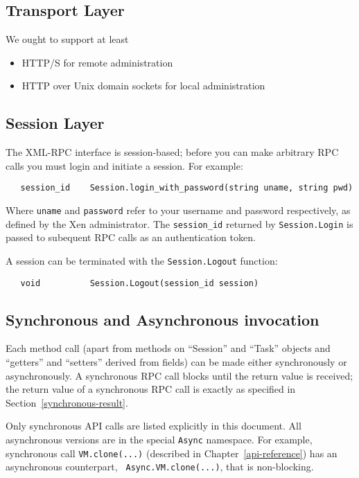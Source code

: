 \subsection{Transport Layer}

We ought to support at least
\begin{itemize}
\item HTTP/S for remote administration
\item HTTP over Unix domain sockets for local administration
\end{itemize}

\subsection{Session Layer}

The XML-RPC interface is session-based; before you can make arbitrary RPC calls
you must login and initiate a session. For example:
\begin{verbatim}
   session_id    Session.login_with_password(string uname, string pwd)
\end{verbatim}
Where {\tt uname} and {\tt password} refer to your username and password
respectively, as defined by the Xen administrator.
The {\tt session\_id} returned by {\tt Session.Login} is passed to subequent
RPC calls as an authentication token.

A session can be terminated with the {\tt Session.Logout} function:
\begin{verbatim}
   void          Session.Logout(session_id session)
\end{verbatim}

\subsection{Synchronous and Asynchronous invocation}

Each method call (apart from methods on ``Session'' and ``Task'' objects 
and ``getters'' and ``setters'' derived from fields)
can be made either synchronously or asynchronously.
A synchronous RPC call blocks until the
return value is received; the return value of a synchronous RPC call is
exactly as specified in Section~\ref{synchronous-result}.

Only synchronous API calls are listed explicitly in this document. 
All asynchronous versions are in the special {\tt Async} namespace.
For example, synchronous call {\tt VM.clone(...)}
(described in Chapter~\ref{api-reference})
has an asynchronous counterpart, {\tt
Async.VM.clone(...)}, that is non-blocking.

